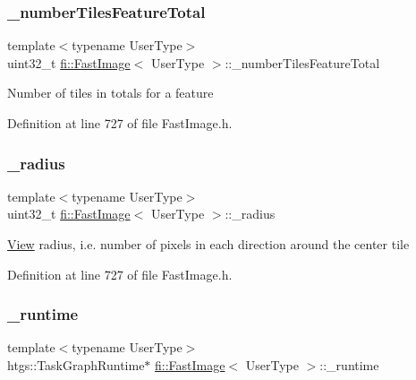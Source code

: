 \mbox{\label{classfi_1_1FastImage_a24f06aeefc60764d9cf261417420d92a}} 
\subsubsection{\texorpdfstring{\+\_\+number\+Tiles\+Feature\+Total}{\_numberTilesFeatureTotal}}
{\footnotesize\ttfamily template$<$typename User\+Type$>$ \\
uint32\+\_\+t \hyperlink{classfi_1_1FastImage}{fi\+::\+Fast\+Image}$<$ User\+Type $>$\+::\+\_\+number\+Tiles\+Feature\+Total\hspace{0.3cm}{\ttfamily [private]}}

Number of tiles in totals for a feature 

Definition at line 727 of file Fast\+Image.\+h.

\mbox{\label{classfi_1_1FastImage_a1ebd8ba4863bd2c0e1a2a3df6469dc27}} 
\subsubsection{\texorpdfstring{\+\_\+radius}{\_radius}}
{\footnotesize\ttfamily template$<$typename User\+Type$>$ \\
uint32\+\_\+t \hyperlink{classfi_1_1FastImage}{fi\+::\+Fast\+Image}$<$ User\+Type $>$\+::\+\_\+radius\hspace{0.3cm}{\ttfamily [private]}}

\hyperlink{classfi_1_1View}{View} radius, i.\+e. number of pixels in each direction around the center tile 

Definition at line 727 of file Fast\+Image.\+h.

\mbox{\label{classfi_1_1FastImage_abff349ecfa318ce51929691878d9230d}} 
\subsubsection{\texorpdfstring{\+\_\+runtime}{\_runtime}}
{\footnotesize\ttfamily template$<$typename User\+Type$>$ \\
htgs\+::\+Task\+Graph\+Runtime$\ast$ \hyperlink{classfi_1_1FastImage}{fi\+::\+Fast\+Image}$<$ User\+Type $>$\+::\+\_\+runtime\hspace{0.3cm}{\ttfamily [private]}}



